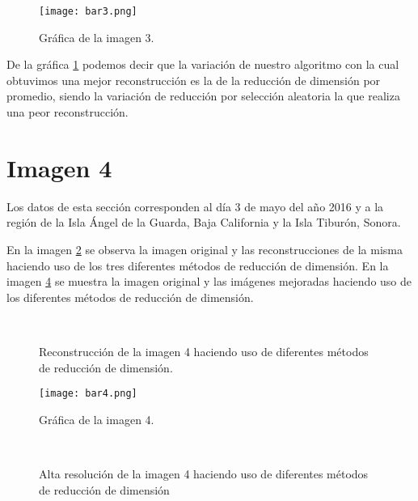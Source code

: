 \begin{figure}
\centering
\texttt{[image: bar3.png]}
\caption{Gráfica de la imagen 3.}
\label{bar3}
\end{figure}

De la gráfica \ref{bar3} podemos decir que la variación de nuestro algoritmo con la cual obtuvimos una mejor reconstrucción es la de la reducción de dimensión por promedio, siendo la variación de reducción por selección aleatoria la que realiza una peor reconstrucción.

\section{Imagen 4}

Los datos de esta sección corresponden al día 3 de mayo del año 2016 y a la región de la Isla Ángel de la Guarda, Baja California y  la Isla Tiburón, Sonora.

 En la imagen \ref{rec4} se observa la imagen original y las reconstrucciones de la misma haciendo uso de los tres diferentes métodos de reducción de dimensión. En la imagen \ref{ar4} se muestra la imagen original y las imágenes mejoradas haciendo uso de los diferentes métodos de reducción de dimensión. 

\begin{figure}[!tbp]
  \centering
  \qquad
  \qquad
  \\
  \caption{Reconstrucción de la imagen 4 haciendo uso de diferentes métodos de reducción de dimensión.}
  \label{rec4}
\end{figure}


\begin{figure}
\centering
\texttt{[image: bar4.png]}
\caption{Gráfica de la imagen 4.}
\label{bar4}
\end{figure}


\begin{figure}[!tbp]
  \centering
  \qquad
  \qquad
  \\
  \caption{Alta resolución de la imagen 4 haciendo uso de diferentes métodos de reducción de dimensión}
  \label{ar4}
\end{figure}

